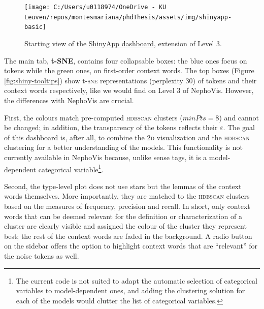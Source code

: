 \documentclass[
]{book}
\begin{document}
\begin{figure}
\texttt{[image: C:/Users/u0118974/OneDrive - KU Leuven/repos/montesmariana/phdThesis/assets/img/shinyapp-basic]} \caption{Starting view of the \href{https://marianamontes.shinyapps.io/Level3/}{ShinyApp dashboard}, extension of Level 3.}\label{fig:shiny-basic}
\end{figure}

The main tab, \textbf{t-SNE}, contains four collapsable boxes: the blue ones focus on tokens while the green ones, on first-order context words. The top boxes (Figure \ref{fig:shiny-tooltips}) show t-\textsc{sne} representations (perplexity 30) of tokens and their context words respectively, like we would find on Level 3 of NephoVis. However, the differences with NephoVis are crucial.

First, the colours match pre-computed \textsc{hdbscan} clusters (\(minPts = 8\)) and cannot be changed; in addition, the transparency of the tokens reflects their \(\varepsilon\). The goal of this dashboard is, after all, to combine the \textsc{2d} visualization and the \textsc{hdbscan} clustering for a better understanding of the models. This functionality is not currently available in NephoVis because, unlike sense tags, it is a model-dependent categorical variable\footnote{The current code is not suited to adapt the automatic selection of categorical variables to model-dependent ones, and adding the clustering solution for each of the models would clutter the list of categorical variables.}.

Second, the type-level plot does not use stars but the lemmas of the context words themselves. More importantly, they are matched to the \textsc{hdbscan} clusters based on the measures of frequency, precision and recall. In short, only context words that can be deemed relevant for the definition or characterization of a cluster are clearly visible and assigned the colour of the cluster they represent best; the rest of the context words are faded in the background. A radio button on the sidebar offers the option to highlight context words that are ``relevant'' for the noise tokens as well.
\end{document}

